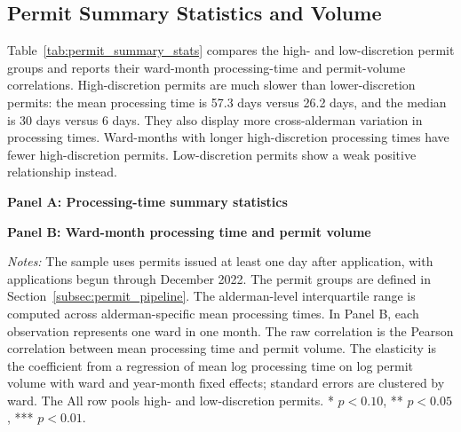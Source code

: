 \subsection{Permit Summary Statistics and Volume}
\label{app:permit_summary_stats}

Table~\ref{tab:permit_summary_stats} compares the high- and low-discretion permit groups and reports their ward-month processing-time and permit-volume correlations.
High-discretion permits are much slower than lower-discretion permits: the mean processing time is 57.3 days versus 26.2 days, and the median is 30 days versus 6 days.
They also display more cross-alderman variation in processing times.
Ward-months with longer high-discretion processing times have fewer high-discretion permits.
Low-discretion permits show a weak positive relationship instead.

\begin{table}[htbp]
    \centering
    \textbf{Panel A: Processing-time summary statistics}\par\smallskip
    

    \vspace{1em}
    \textbf{Panel B: Ward-month processing time and permit volume}\par\smallskip
    
    \caption{Summary Statistics for High- and Low-Discretion Permits}
    \label{tab:permit_summary_stats}
    \label{tab:permit_volume_correlation}

    \footnotesize
    \textit{Notes:} The sample uses permits issued at least one day after application, with applications begun through December 2022.
    The permit groups are defined in Section~\ref{subsec:permit_pipeline}.
    The alderman-level interquartile range is computed across alderman-specific mean processing times.
    In Panel B, each observation represents one ward in one month. The raw correlation is the Pearson correlation between mean processing time and permit volume.
    The elasticity is the coefficient from a regression of mean log processing time on log permit volume with ward and year-month fixed effects; standard errors are clustered by ward.
    The All row pools high- and low-discretion permits. * $p<0.10$, ** $p<0.05$, *** $p<0.01$.
\end{table}
